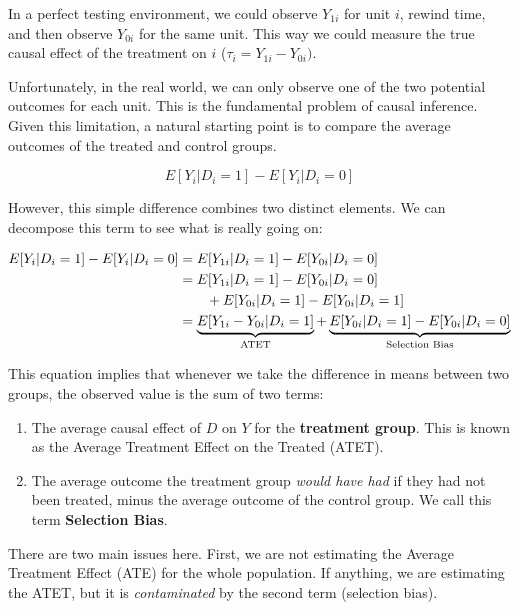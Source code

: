 \documentclass[12pt]{article}
\begin{document}
In a perfect testing environment, we could observe $Y_{1i}$ for unit $i$, rewind time,
and then observe $Y_{0i}$ for the same unit. This way we could measure the true causal
effect of the treatment on $i$ ($\tau_i = Y_{1i} - Y_{0i})$.

Unfortunately, in the real world, we can only observe one of the two potential
outcomes for each unit. This is the fundamental problem of causal inference. Given this
limitation, a natural starting point is to compare the average outcomes of the treated
and control groups.

\begin{equation}
    E[Y_i | D_i = 1] - E[Y_i | D_i = 0]
\end{equation}

However, this simple difference combines two distinct elements. We can decompose this
term to see what is really going on:

\begin{equation}\label{decomp}
\begin{split}
    E[Y_i | D_i = 1] - E[Y_i | D_i = 0] & = E[Y_{1i} | D_i = 1] - E[Y_{0i} | D_i = 0] \\
    & = E[Y_{1i} | D_i = 1] - E[Y_{0i} | D_i = 0] \\
    & \text{\qquad} + E[Y_{0i} | D_i = 1] -
    E[Y_{0i} | D_i = 1] \\
    & = \underbrace{E[Y_{1i} - Y_{0i} | D_i = 1]}_{\text{ATET}} + \underbrace{
        E[Y_{0i} | D_i = 1] - E[Y_{0i} | D_i = 0]
    }_{\text{Selection Bias}}
\end{split}
\end{equation}

This equation implies that whenever we take the difference in means between two groups,
the observed value is the sum of two terms:
\begin{enumerate}
    \item The average causal effect of $D$ on $Y$ for the \textbf{treatment
    group}. This is known as the Average Treatment Effect on the Treated (ATET).
    \item The average outcome the treatment group \textit{would have had} if they had
    not been treated, minus the average outcome of the control group. We call this term
    \textbf{Selection Bias}.
\end{enumerate}

There are two main issues here. First, we are not estimating the Average Treatment
Effect (ATE) for the whole population. If anything, we are estimating the ATET, but it
is \textit{contaminated} by the second term (selection bias).
\end{document}
